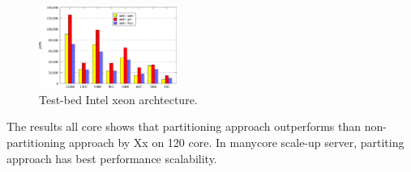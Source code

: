 \begin{figure}[h]
  \begin{center}
     \includegraphics[width=0.4\textwidth]{graph/SPECjbb2013}
  \end{center}
  \caption{Test-bed Intel xeon archtecture.}
  \label{fig:basic}
\end{figure}

\ifkor

The results all core shows that partitioning approach outperforms than
non-partitioning approach by Xx on 120 core.
In manycore scale-up server, partiting approach has best performance
scalability.
\else
\fi
